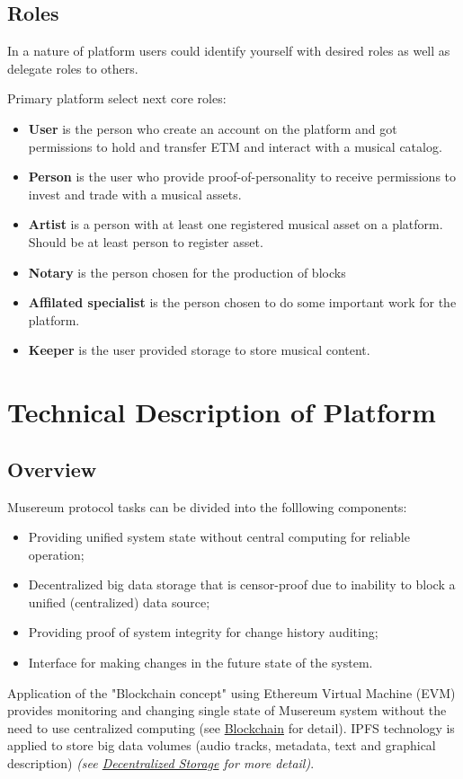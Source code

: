 \documentclass[12pt]{report}
\begin{document}
\section{Roles}
\label{platform-roles}
In a nature of platform users could identify yourself with desired roles as well as delegate roles to others.

Primary platform select next core roles:
\begin{itemize}
	\item \textbf{User} is the person who create an account on the platform and got permissions to hold and transfer ETM and interact with a musical catalog.
	\item \textbf{Person} is the user who provide proof-of-personality to receive permissions to invest and trade with a musical assets.
	\item \textbf{Artist} is a person with at least one registered musical asset on a platform. Should be at least person to register asset.
	\item \textbf{Notary} is the person chosen for the production of blocks
	\item \textbf{Affilated specialist} is the person chosen to do some important work for the platform. 
	\item \textbf{Keeper} is the user provided storage to store musical content.
\end{itemize}

\chapter{Technical Description of Platform}
\section{Overview}
\label{tech-review}
\begin{multicols}{2}
Musereum protocol tasks can be divided into the folllowing components:
\begin{itemize}
\item Providing unified system state without central computing for reliable operation;
\item Decentralized big data storage that is censor-proof due to inability to block a unified (centralized) data source;
\item Providing proof of system integrity for change history auditing;
\item Interface for making changes in the future state of the system.
\end{itemize}
\vfill\null
\columnbreak
Application of the "Blockchain concept" using Ethereum Virtual Machine (EVM) provides monitoring and changing single state of Musereum system without the need to use centralized computing (see \hyperref[tech-blockchain]{Blockchain} for detail). IPFS technology is applied to store big data volumes (audio tracks, metadata, text and graphical description) \textit{(see \hyperref[tech-storage]{Decentralized Storage} for more detail)}.

\end{multicols}
\pagebreak
\end{document}
